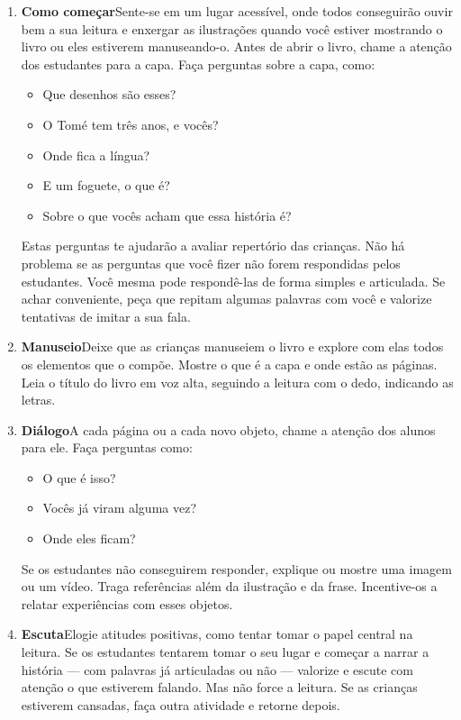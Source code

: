 \documentclass[11pt]{extarticle}
\begin{document}
\begin{enumerate}
\item \textbf{Como começar}\quad Sente-se em um lugar acessível, 
onde todos conseguirão ouvir bem a sua leitura e enxergar as ilustrações 
quando você estiver mostrando o livro ou eles estiverem manuseando-o. 
Antes de abrir o livro, chame a atenção dos estudantes para a capa. 
Faça perguntas sobre a capa, como: 

\begin{itemize}
\item Que desenhos são esses?
\item O Tomé tem três anos, e vocês?
\item Onde fica a língua?
\item E um foguete, o que é?
\item Sobre o que vocês acham que essa história é?
\end{itemize}

Estas perguntas te ajudarão a avaliar repertório das crianças. 
Não há problema se as perguntas que você fizer não forem respondidas pelos 
estudantes. Você mesma pode respondê-las de forma simples e articulada. Se achar 
conveniente, peça que repitam algumas palavras com você e valorize tentativas 
de imitar a sua fala. 
 
\item \textbf{Manuseio}\quad Deixe que as crianças manuseiem o livro 
e explore com elas todos os elementos que o compõe. Mostre o que é a 
capa e onde estão as páginas. Leia o título do livro em voz alta, seguindo 
a leitura com o dedo, indicando as letras. 

\item \textbf{Diálogo}\quad A cada página ou a cada novo objeto,
chame a atenção dos alunos para ele. Faça perguntas como:

\begin{itemize}
\item O que é isso?
\item Vocês já viram alguma vez? 
\item Onde eles ficam? 
\end{itemize}

Se os estudantes não conseguirem responder, explique ou mostre uma 
imagem ou um vídeo. Traga referências além da ilustração e da frase. 
Incentive-os a relatar experiências com esses objetos.

\item \textbf{Escuta}\quad Elogie atitudes positivas, como 
tentar tomar o papel central na leitura. Se os estudantes tentarem 
tomar o seu lugar e começar a narrar a história --- com palavras já articuladas 
ou não --- valorize e escute com atenção o que estiverem falando. Mas não 
force a leitura. Se as crianças estiverem cansadas, faça outra atividade 
e retorne depois. 


\end{enumerate}
\end{document}
